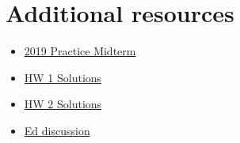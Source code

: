 \documentclass{article}
\begin{document}
\section{Additional resources}
\begin{itemize}
  \item \href{https://web.stanford.edu/class/ee364a/solutions/midterm_19_sol.pdf}{2019 Practice Midterm}
  \item \href{https://web.stanford.edu/class/ee364a/solutions/hw/2022_hw1sol.pdf}{HW 1 Solutions}
  \item \href{https://web.stanford.edu/class/ee364a/solutions/hw/2022_hw2sol.pdf}{HW 2 Solutions}
  \item \href{https://edstem.org/us/courses/16230/discussion/}{Ed discussion}
\end{itemize}
\end{document}

